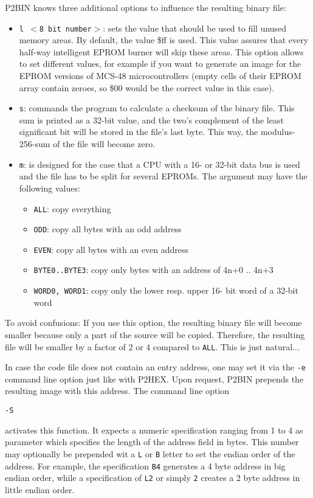 \documentclass[12pt,twoside]{report}
\newcommand{\tty}[1]{{\tt #1}}
\begin{document}
P2BIN knows three additional options to influence the resulting binary
file:
\begin{itemize}
\item{\tty{l $<$8 bit number$>$}: sets the value that should be used to fill
      unused memory areas.  By default, the value
      \$ff is used.  This value assures that every
      half-way intelligent EPROM burner will skip
      these areas.  This option allows to set different values,
      for example if you want to
      generate an image for the EPROM versions of
      MCS-48 microcontrollers (empty cells of their
      EPROM array contain zeroes, so \$00 would be
      the correct value in this case).}
\item{\tty{s}:  commands the program to calculate a checksum
      of the binary file.  This sum is printed as
      a 32-bit value, and the two's complement of
      the least significant bit will be stored in
      the file's last byte.  This way, the modulus-
      256-sum of the file will become zero.}
\item{\tty{m}:  is designed for the case that a CPU with a
      16- or 32-bit data bus is used and the file
      has to be split for several EPROMs.  The
      argument may have the following values:
      \begin{itemize}
      \item{\tty{ALL}: copy everything}
      \item{\tty{ODD}: copy all bytes with an odd address}
      \item{\tty{EVEN}: copy all bytes with an even address}
      \item{\tty{BYTE0..BYTE3}: copy only bytes with an address of
            4n+0 .. 4n+3}
      \item{\tty{WORD0, WORD1}: copy only the lower resp. upper 16-
            bit word of a 32-bit word}
      \end{itemize}}
\end{itemize}
To avoid confusions: If you use this option, the resulting binary file
will become smaller because only a part of the source will be copied.
Therefore, the resulting file will be smaller by a factor of 2 or 4
compared to \tty{ALL}.  This is just natural...

In case the code file does not contain an entry address, one may set
it via the \tty{-e} command line option just like with P2HEX.  Upon
request, P2BIN prepends the resulting image with this address.  The
command line option
\begin{verbatim}
-S
\end{verbatim}
activates this function.  It expects a numeric specification ranging
from 1 to 4 as parameter which specifies the length of the address
field in bytes.  This number may optionally be prepended wit a \tty{L} or
\tty{B} letter to set the endian order of the address.  For example, the
specification \tty{B4} generates a 4 byte address in big endian order,
while a specification of \tty{L2} or simply \tty{2} creates a 2 byte address
in little endian order.
\end{document}

